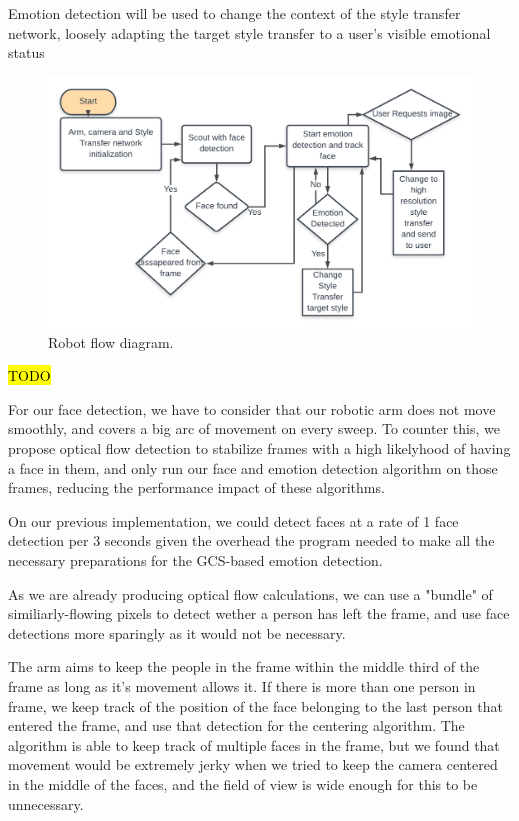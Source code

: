 \documentclass[journal,onecolumn]{IEEEtran}
\begin{document}
Emotion detection will be used to change the context of the style transfer network, loosely adapting the target style transfer to a user's visible emotional status

\begin{figure}
  \centering
  \includegraphics[width=\textwidth]{resources/state_machine.png}
  \caption{Robot flow diagram.}\label{fig:state_machine}
\end{figure}



\hl{TODO}



For our face detection, we have to consider that our robotic arm does not move smoothly, and covers a big arc of movement on every sweep. To counter this, we propose optical flow detection to stabilize frames with a high likelyhood of having a face in them, and only run our face and emotion detection algorithm on those frames, reducing the performance impact of these algorithms.

On our previous implementation, we could detect faces at a rate of 1 face detection per 3 seconds given the overhead the program needed to make all the necessary preparations for the GCS-based emotion detection. 

As we are already producing optical flow calculations, we can use a "bundle" of similiarly-flowing pixels to detect wether a person has left the frame, and use face detections more sparingly as it would not be necessary.

The arm aims to keep the people in the frame within the middle third of the frame as long as it's movement allows it. If there is more than one person in frame, we keep track of the position of the face belonging to the last person that entered the frame, and use that detection for the centering algorithm. The algorithm is able to keep track of multiple faces in the frame, but we found that movement would be extremely jerky when we tried to keep the camera centered in the middle of the faces, and the field of view is wide enough for this to be unnecessary. 
\end{document}
